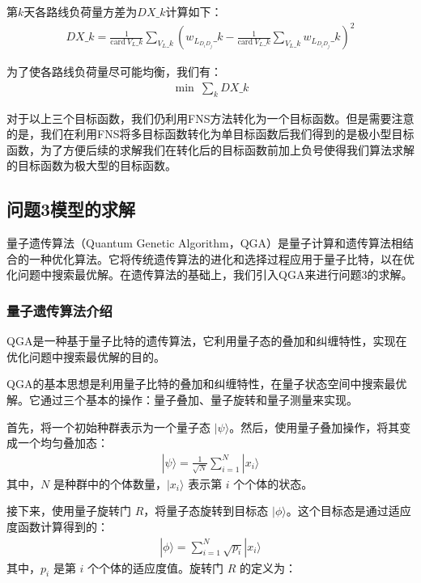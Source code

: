 \documentclass{MathorCupmodeling}
\begin{document}
第$k$天各路线负荷量方差为$DX\_k$计算如下：
\begin{eqnarray}
DX\_k=\frac{1}{{\text{card}}\ V_{L}\_k}\sum\limits_{V_{L}\_k}(w_{L_{D_iD_j}}\_k-\frac{1}{{\text{card}}\ V_{L}\_k}\sum\limits_{V_{L}\_k}w_{L_{D_iD_j}}\_k)^2
\end{eqnarray}

为了使各路线负荷量尽可能均衡，我们有：
\begin{eqnarray}
\min \ \sum\limits_{k}DX\_k
\end{eqnarray}


对于以上三个目标函数，我们仍利用FNS方法转化为一个目标函数。但是需要注意的是，我们在利用FNS将多目标函数转化为单目标函数后我们得到的是极小型目标函数，为了方便后续的求解我们在转化后的目标函数前加上负号使得我们算法求解的目标函数为极大型的目标函数。
\subsection{问题3模型的求解}
量子遗传算法（Quantum Genetic Algorithm，QGA）是量子计算和遗传算法相结合的一种优化算法。它将传统遗传算法的进化和选择过程应用于量子比特，以在优化问题中搜索最优解。在遗传算法的基础上，我们引入QGA来进行问题3的求解。
\subsubsection{量子遗传算法介绍}
QGA是一种基于量子比特的遗传算法，它利用量子态的叠加和纠缠特性，实现在优化问题中搜索最优解的目的。

QGA的基本思想是利用量子比特的叠加和纠缠特性，在量子状态空间中搜索最优解。它通过三个基本的操作：量子叠加、量子旋转和量子测量来实现。

首先，将一个初始种群表示为一个量子态 $|\psi\rangle$。然后，使用量子叠加操作，将其变成一个均匀叠加态：
\begin{eqnarray}
|\psi\rangle=\frac{1}{\sqrt{N}}\sum_{i=1}^{N}|x_i\rangle
\end{eqnarray}
其中，$N$ 是种群中的个体数量，$|x_i\rangle$ 表示第 $i$ 个个体的状态。

接下来，使用量子旋转门 $R$，将量子态旋转到目标态 $|\phi\rangle$。这个目标态是通过适应度函数计算得到的：
\begin{eqnarray}
|\phi\rangle=\sum_{i=1}^{N}\sqrt{p_i}|x_i\rangle
\end{eqnarray}
其中，$p_i$ 是第 $i$ 个个体的适应度值。旋转门 $R$ 的定义为：
\end{document}

